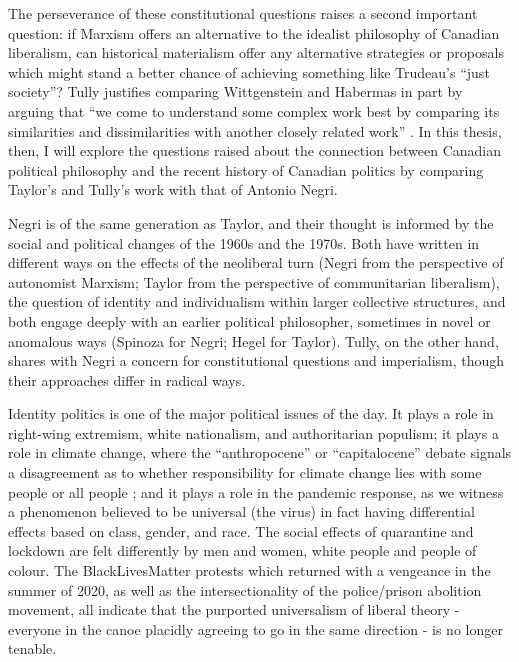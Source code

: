 \documentclass[12pt,oneside]{memoir}
\begin{document}
The perseverance of these constitutional questions raises a second important question: if Marxism offers an alternative to the idealist philosophy of Canadian liberalism, can historical materialism offer any alternative strategies or proposals which might stand a better chance of achieving something like Trudeau’s “just society”? Tully justifies comparing Wittgenstein and Habermas in part by arguing that “we come to understand some complex work best by comparing its similarities and dissimilarities with another closely related work” \citep[71]{Tully2008}. In this thesis, then, I will explore the questions raised about the connection between Canadian political philosophy and the recent history of Canadian politics by comparing Taylor’s and Tully’s work with that of Antonio Negri.

Negri is of the same generation as Taylor, and their thought is informed by the social and political changes of the 1960s and the 1970s. Both have written in different ways on the effects of the neoliberal turn (Negri from the perspective of autonomist Marxism; Taylor from the perspective of communitarian liberalism), the question of identity and individualism within larger collective structures, and both engage deeply with an earlier political philosopher, sometimes in novel or anomalous ways (Spinoza for Negri; Hegel for Taylor). Tully, on the other hand, shares with Negri a concern for constitutional questions and imperialism, though their approaches differ in radical ways.

Identity politics is one of the major political issues of the day. It plays a role in right-wing extremism, white nationalism, and authoritarian populism; it plays a role in climate change, where the “anthropocene” or “capitalocene” debate signals a disagreement as to whether responsibility for climate change lies with some people or all people \citep{Moore2016}; and it plays a role in the pandemic response, as we witness a phenomenon believed to be universal (the virus) in fact having differential effects based on class, gender, and race. The social effects of quarantine and lockdown are felt differently by men and women, white people and people of colour. The BlackLivesMatter protests which returned with a vengeance in the summer of 2020, as well as the intersectionality of the police/prison abolition movement, all indicate that the purported universalism of liberal theory - everyone in the canoe placidly agreeing to go in the same direction -  is no longer tenable.
\end{document}
